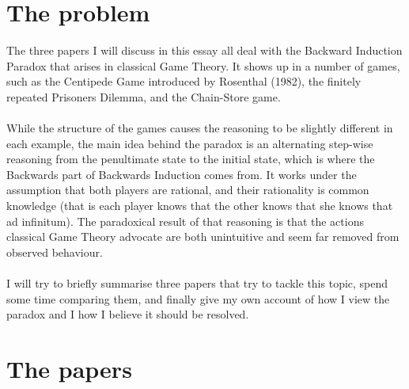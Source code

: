 \documentclass{article}
\begin{document}
\section{The problem}
The three papers I will discuss in this essay all deal with the Backward Induction Paradox that arises in classical Game Theory. It shows up in a number of games, such as the Centipede Game introduced by Rosenthal (1982), the finitely repeated Prisoners Dilemma, and the Chain-Store game.
\\
\\
While the structure of the games causes the reasoning to be slightly different in each example, the main idea behind the paradox is an alternating step-wise reasoning from the penultimate state to the initial state, which is where the Backwards part of Backwards Induction comes from. It works under the assumption that both players are rational, and their rationality is common knowledge (that is each player knows that the other knows that she knows that ad infinitum). The paradoxical result of that reasoning is that the actions classical Game Theory advocate are both unintuitive and seem far removed from observed behaviour.
\\
\\
I will try to briefly summarise three papers that try to tackle this topic, spend some time comparing them, and finally give my own account of how I view the paradox and I how I believe it should be resolved. 





















\section{The papers}
\end{document}
